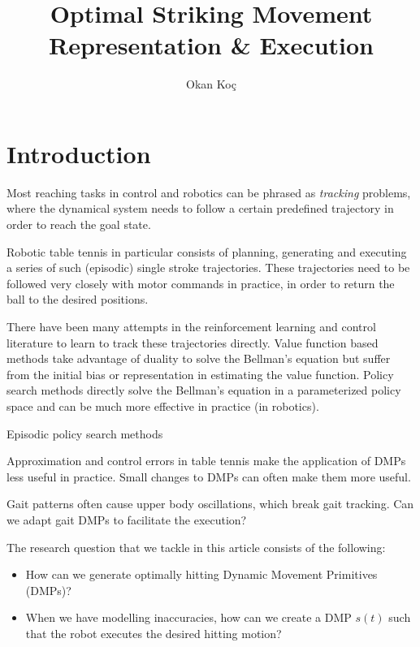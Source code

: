 \documentclass[10pt,a4paper]{article}
\author{Okan Ko\c c}
\title{Optimal Striking Movement Representation \& Execution}
\newcommand{\dmp}{s} %
\begin{document}
\maketitle

\section{Introduction}


Most reaching tasks in control and robotics can be phrased as \emph{tracking} problems, where the dynamical system needs to follow a certain predefined trajectory in order to reach the goal state. 

Robotic table tennis in particular consists of planning, generating and executing a series of such (episodic) single stroke trajectories. These trajectories need to be followed very closely with motor commands in practice, in order to return the ball to the desired positions. 

There have been many attempts in the reinforcement learning \cite{Sutton98} and control literature to learn to track these trajectories directly. Value function based methods take advantage of duality to solve the Bellman's equation but suffer from the initial bias or representation in estimating the value function. Policy search methods directly solve the Bellman's equation in a parameterized policy space and can be much more effective in practice (in robotics). 

Episodic policy search methods 

Approximation and control errors in table tennis make the application of DMPs less useful in practice. Small changes to DMPs can often make them more useful.

Gait patterns often cause upper body oscillations, which break gait tracking. Can we adapt gait DMPs to facilitate the execution?

The research question that we tackle in this article consists of the following:

\begin{itemize}
\item How can we generate optimally hitting Dynamic Movement Primitives (DMPs)?

\item When we have modelling inaccuracies, how can we create a DMP $\dmp(t)$ such that the robot executes the desired hitting motion?
\end{itemize}
\end{document}
